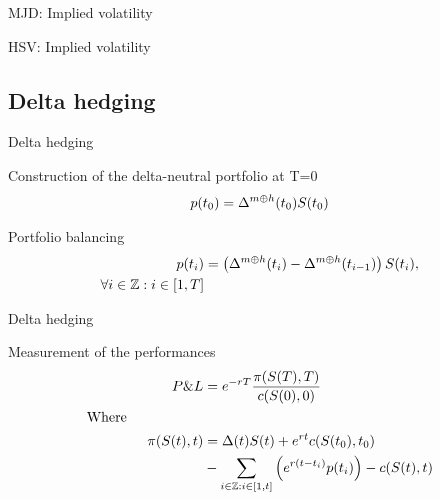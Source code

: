 \documentclass{beamer}
\begin{document}
\begin{frame}{MJD: Implied volatility}


\begin{figure}[h]
\centering

\end{figure}

\end{frame}

\begin{frame}{HSV: Implied volatility}

\begin{figure}[h]
\centering

\end{figure}

 
\end{frame}



\subsection{Delta hedging}
\begin{frame}{Delta hedging}

\begin{block}{Construction of the delta-neutral portfolio at T=0}
\begin{align}
p(t_0) = \Delta^{m \oplus h}(t_0) S(t_0) \notag
\end{align}
\end{block}

\begin{block}{Portfolio balancing}
\begin{align}
p(t_i) & = \left(\Delta^{m \oplus h}(t_i) - \Delta^{m \oplus h}(t_{i - 1})\right) S(t_i) 
,\notag \\
\forall i \in \mathbb{Z} : i \in \left [1, T \right ] \notag
\end{align}
\end{block}


\end{frame}


\begin{frame}{Delta hedging}

\begin{block}{Measurement of the performances}
\begin{align}
  P\&L &= e^{-rT} \frac{\pi(S(T), T)}{c(S(0), 0)} \notag\\
  \intertext{Where}
  \pi(S(t), t) &= \Delta(t)S(t) + e^{rt} c(S(t_0), t_0)\notag\\
    \mspace{150mu}
    &- \sum_{i \in \mathbb{Z} : i \in \left [1, t \right ]} \left( e^{r(t-t_i)} p(t_i) \right) - c(S(t), t)\notag
\end{align}
\end{block}
 
\end{frame}
\end{document}
